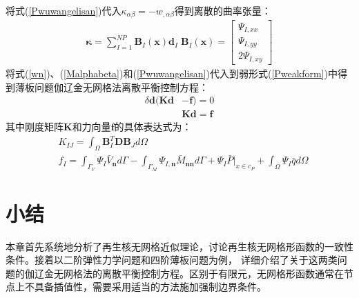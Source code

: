 将式(\ref{Pwuwangelisan})代入$\kappa_{\alpha\beta}=-w_{,\alpha\beta}$得到离散的曲率张量：
\begin{equation}
\begin{split}
\pmb{\kappa}=\sum_{I=1}^{N\!P}\pmb{B}_I(\pmb{x})\pmb{d}_I\;
\pmb{B}_I(\pmb{x})= \left[\begin{matrix}\Psi_{I,xx}\\\Psi_{I,yy}\\2\Psi_{I,xy}\end{matrix}\right] 
\end{split}
\end{equation}
将式(\ref{wn})、(\ref{Malphabeta})和(\ref{Pwuwangelisan})代入到弱形式(\ref{Pweakform})中得到薄板问题伽辽金无网格法离散平衡控制方程：
\begin{equation}
\begin{split}
    \delta\pmb{d}(\pmb{K}\pmb{d}&-\pmb{f})=0\\
     &\pmb{K}\pmb{d}=\pmb{f}
\end{split}
\end{equation}
其中刚度矩阵$\pmb{K}$和力向量$\pmb{f}$的具体表达式为：
\begin{equation}\label{PKf}
\begin{split}
    &K_{IJ}=\int_{\Omega}\pmb{B}^T_I\pmb{D}\pmb{B}_Jd\Omega\\
    &f_I=\int_{\Gamma_V}\Psi_I\bar{V}_{\pmb{n}}d\Gamma-\int_{\Gamma_M}\Psi_{I,\pmb{n}}\bar{M}_{\pmb{nn}}d\Gamma+\Psi_I\bar{P}\vert_{x\in c_P}+\int_{\Omega}\Psi_I\bar{q}d\Omega
\end{split}
\end{equation}
\section{小结}
本章首先系统地分析了再生核无网格近似理论，讨论再生核无网格形函数的一致性条件。接着以二阶弹性力学问题和四阶薄板问题为例，
详细介绍了关于这两类问题的伽辽金无网格法的离散平衡控制方程。区别于有限元，无网格形函数通常在节点上不具备插值性，需要采用适当的方法施加强制边界条件。